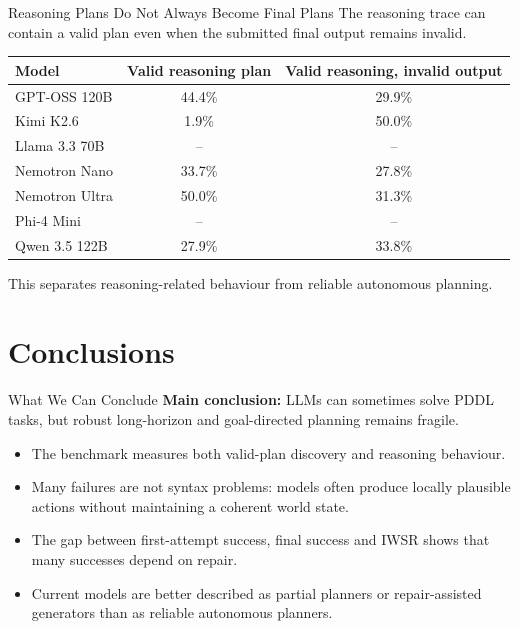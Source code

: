 \documentclass{beamer}
\begin{document}
\begin{frame}{Reasoning Plans Do Not Always Become Final Plans}\scriptsize
    The reasoning trace can contain a valid plan even when the submitted final output remains invalid.

    \vspace{0.15cm}
    \centering
    \renewcommand{\arraystretch}{1.15}
    \begin{tabularx}{0.92\textwidth}{>{\raggedright\arraybackslash}Xcc}
        \toprule
        \textbf{Model} & \textbf{Valid reasoning plan} & \textbf{Valid reasoning, invalid output} \\
        \midrule
        GPT-OSS 120B & 44.4\% & 29.9\% \\
        Kimi K2.6 & 1.9\% & 50.0\% \\
        Llama 3.3 70B & -- & -- \\
        Nemotron Nano & 33.7\% & 27.8\% \\
        Nemotron Ultra & 50.0\% & 31.3\% \\
        Phi-4 Mini & -- & -- \\
        Qwen 3.5 122B & 27.9\% & 33.8\% \\
        \bottomrule
    \end{tabularx}

    \vspace{0.25cm}
    \raggedright
    This separates reasoning-related behaviour from reliable autonomous planning.
\end{frame}
\section{Conclusions}

\begin{frame}{What We Can Conclude}\footnotesize
    \textbf{Main conclusion:} LLMs can sometimes solve PDDL tasks, but robust long-horizon and goal-directed planning remains fragile.

    \vspace{0.3cm}
    \begin{itemize}
        \item The benchmark measures both valid-plan discovery and reasoning behaviour.
        \item Many failures are not syntax problems: models often produce locally plausible actions without maintaining a coherent world state.
        \item The gap between first-attempt success, final success and IWSR shows that many successes depend on repair.
        \item Current models are better described as partial planners or repair-assisted generators than as reliable autonomous planners.
    \end{itemize}
\end{frame}
\end{document}
